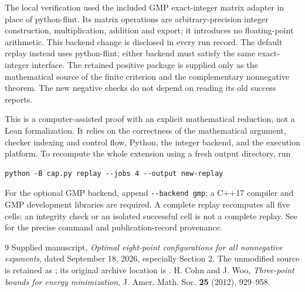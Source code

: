 \documentclass[11pt,reqno]{amsart}
\theoremstyle{remark}\newtheorem{remark}[theorem]{Remark}
\numberwithin{equation}{section}
\begin{document}
The local verification used the included GMP exact-integer matrix adapter
in place of python-flint. Its matrix operations are arbitrary-precision
integer construction, multiplication, addition and export; it introduces
no floating-point arithmetic. This backend change is disclosed in every
run record. The default replay instead uses python-flint; either backend
must satisfy the same exact-integer interface. The retained positive
package is supplied only as the mathematical source of the finite
criterion and the complementary nonnegative theorem. The new negative
checks do not depend on reading its old success reports.

This is a computer-assisted proof with an explicit mathematical reduction,
not a Lean formalization. It relies on the correctness of the mathematical
argument, checker indexing and control flow, Python, the integer backend,
and the execution platform. To recompute the whole extension using a
fresh output directory, run
\begin{verbatim}
python -B cap.py replay --jobs 4 --output new-replay
\end{verbatim}
For the optional GMP backend, append \verb|--backend gmp|; a C++17 compiler
and GMP development libraries are required. A complete replay recomputes
all five cells; an integrity check or an isolated successful cell is not
a complete replay. See  for the precise command and
publication-record provenance.

\begin{thebibliography}{9}
 Supplied manuscript, \emph{Optimal eight-point configurations
for all nonnegative exponents}, dated September 18, 2026, especially
Section 2. The unmodified source is retained as
; its original archive location is
.
 H. Cohn and J. Woo, \emph{Three-point bounds for energy
minimization}, J. Amer. Math. Soc. \textbf{25} (2012), 929--958.
\end{thebibliography}
\end{document}
